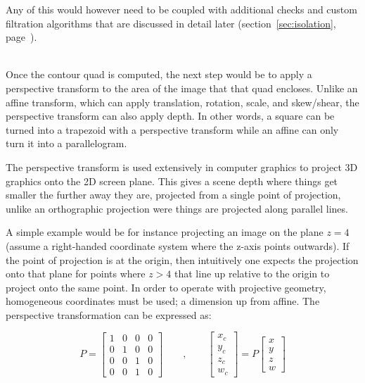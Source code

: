 \documentclass[a4paper,12pt,notitlepage]{article}
\newcommand{\secref}[1]{(section~\ref{#1}, page~\pageref{#1})}
\begin{document}
			Any of this would however need to be coupled with additional checks and custom filtration algorithms that are discussed in detail later \secref{sec:isolation}.

			~\\

			Once the contour quad is computed, the next step would be to apply a perspective transform to the area of the image that that quad encloses. Unlike an affine transform, which can apply translation, rotation, scale, and skew/shear, the perspective transform can also apply depth. In other words, a square can be turned into a trapezoid with a perspective transform while an affine can only turn it into a parallelogram.

			The perspective transform is used extensively in computer graphics to project 3D graphics onto the 2D screen plane. This gives a scene depth where things get smaller the further away they are, projected from a single point of projection, unlike an orthographic projection were things are projected along parallel lines.

			A simple example would be for instance projecting an image on the plane $z = 4$ (assume a right-handed coordinate system where the z-axis points outwards). If the point of projection is at the origin, then intuitively one expects the projection onto that plane for points where $z > 4$ that line up relative to the origin to project onto the same point. In order to operate with projective geometry, homogeneous coordinates must be used; a dimension up from affine. The perspective transformation can be expressed as:

			\begin{equation}
				P =
				\begin{bmatrix}
					1 & 0 & 0 & 0\\
					0 & 1 & 0 & 0\\
					0 & 0 & 1 & 0\\
					0 & 0 & 1 & 0
				\end{bmatrix}\qquad,\qquad
				\begin{bmatrix}
					x_c\\
					y_c\\
					z_c\\
					w_c
				\end{bmatrix}
				= P
				\begin{bmatrix}
					x\\
					y\\
					z\\
					w
				\end{bmatrix}
			\end{equation}
\end{document}
